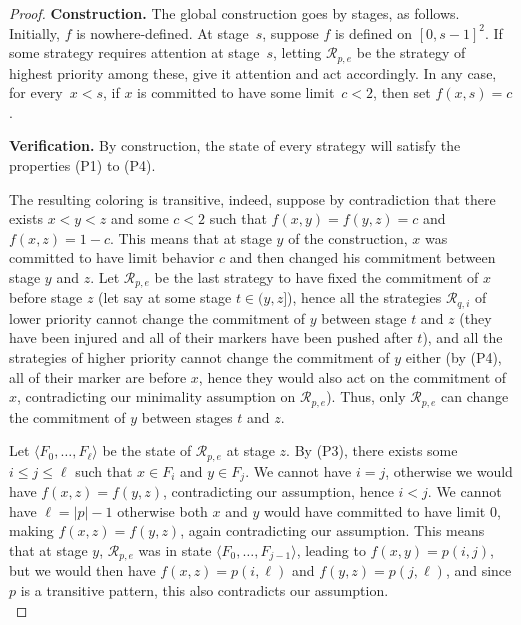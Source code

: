 \documentclass{article}
\numberwithin{theorem}{section}
\newcommand{\R}{\mathcal{R}}
\begin{document}
\begin{proof}
\textbf{Construction.}
The global construction goes by stages, as follows. Initially, $f$ is nowhere-defined.
At stage~$s$, suppose $f$ is defined on $[0, s-1]^2$. If some strategy requires attention at stage~$s$, letting $\R_{p, e}$ be the strategy of highest priority among these, give it attention and act accordingly. 
In any case, for every~$x < s$, if $x$ is committed to have some limit~$c < 2$, then set $f(x, s) = c$.
\smallskip

\textbf{Verification.}
By construction, the state of every strategy will satisfy the properties (P1) to (P4). 


The resulting coloring is transitive, indeed, suppose by contradiction that there exists $x < y < z$ and some $c < 2$ such that $f(x,y) = f(y,z) = c$ and $f(x,z) = 1 - c$. This means that at stage $y$ of the construction, $x$ was committed to have limit behavior $c$ and then changed his commitment between stage $y$ and $z$. Let $\R_{p,e}$ be the last strategy to have fixed the commitment of $x$ before stage $z$ (let say at some stage $t \in (y,z]$), hence all the strategies $\R_{q,i}$ of lower priority cannot change the commitment of $y$ between stage $t$ and $z$ (they have been injured and all of their markers have been pushed after $t$), and all the strategies of higher priority cannot change the commitment of $y$ either (by (P4), all of their marker are before $x$, hence they would also act on the commitment of $x$, contradicting our minimality assumption on $\R_{p,e}$). Thus, only $\R_{p,e}$ can change the commitment of $y$ between stages $t$ and $z$.

Let $\langle F_0, \dots, F_{\ell} \rangle$ be the state of $\R_{p,e}$ at stage $z$. By (P3), there exists some $i \leq j \leq \ell$ such that $x \in F_i$ and $y \in F_j$. We cannot have $i = j$, otherwise we would have $f(x,z) = f(y,z)$, contradicting our assumption, hence $i < j$. We cannot have $\ell = |p| - 1$ otherwise both $x$ and $y$ would have committed to have limit $0$, making $f(x,z) = f(y,z)$, again contradicting our assumption. This means that at stage $y$, $\R_{p,e}$ was in state $\langle F_0, \dots, F_{j-1} \rangle$, leading to $f(x,y) = p(i,j)$, but we would then have $f(x,z) = p(i,\ell)$ and $f(y,z) = p(j,\ell)$, and since $p$ is a transitive pattern, this also contradicts our assumption. \\




\end{proof}
\end{document}
